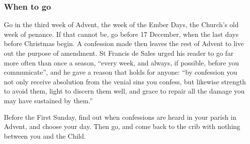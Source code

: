 \subsubsection*{When to go}

Go in the third week of Advent, the week of the Ember Days, the Church's old
week of penance. If that cannot be, go before 17 December, when the last days
before Christmas begin. A confession made then leaves the rest of Advent to live
out the purpose of amendment. St Francis de Sales urged his reader to go far
more often than once a season, ``every week, and always, if possible, before you
communicate'', and he gave a reason that holds for anyone: ``by confession you
not only receive absolution from the venial sins you confess, but likewise
strength to avoid them, light to discern them well, and grace to repair all the
damage you may have sustained by them.''

Before the First Sunday, find out when confessions are heard in your parish in
Advent, and choose your day. Then go, and come back to the crib with nothing
between you and the Child.
